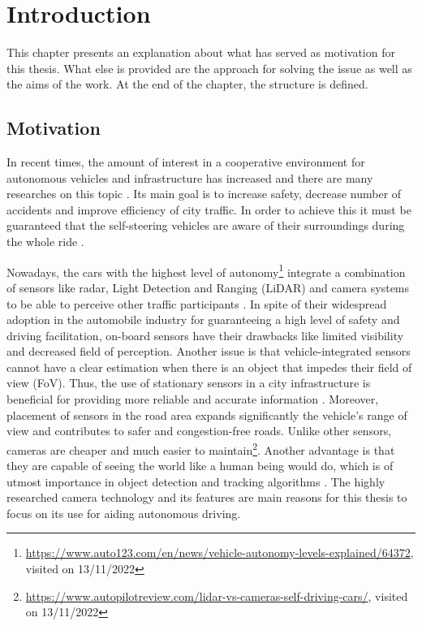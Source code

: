\chapter{Introduction}
\label{introduction}
This chapter presents an explanation about what has served as motivation for this thesis. What else is provided are the approach for solving the issue as well as the aims of the work. At the end of the chapter, the structure is defined.

\section{Motivation}
In recent times, the amount of interest in a cooperative environment for autonomous vehicles and infrastructure has increased and there are many researches on this topic \cite{ cvis_article_one, cvis_article_two}. Its main goal is to increase safety, decrease number of accidents and improve efficiency of city traffic. In order to achieve this it must be guaranteed that the self-steering vehicles are aware of their surroundings during the whole ride \cite{onboard_sensors}.

Nowadays, the cars with the highest level of autonomy\footnote{\url{https://www.auto123.com/en/news/vehicle-autonomy-levels-explained/64372}, visited on 13/11/2022} integrate a combination of sensors like radar, Light Detection and Ranging (LiDAR) and camera systems to be able to perceive other traffic participants \cite{autonomous_cars_sensors}. In spite of their widespread adoption in the automobile industry for guaranteeing a high level of safety and driving facilitation, on-board sensors have their drawbacks like limited visibility and decreased field of perception. Another issue is that vehicle-integrated sensors cannot have a clear estimation when there is an object that impedes their field of view (FoV). Thus, the use of stationary sensors in a city infrastructure is beneficial for providing more reliable and accurate information \cite{roadside_lidar}. Moreover, placement of sensors in the road area expands significantly the vehicle's range of view and contributes to safer and congestion-free roads. Unlike other sensors, cameras are cheaper and much easier to maintain\footnote{\url{https://www.autopilotreview.com/lidar-vs-cameras-self-driving-cars/}, visited on 13/11/2022}. Another advantage is that they are capable of seeing the world like a human being would do, which is of utmost importance in object detection and tracking algorithms \cite{camera_object_detection}. The highly researched camera technology and its features are main reasons for this thesis to focus on its use for aiding autonomous driving.

